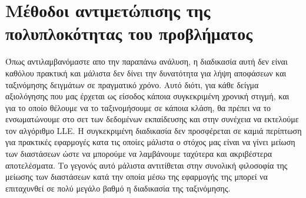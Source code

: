 \section{Μέθοδοι αντιμετώπισης της πολυπλοκότητας του προβλήματος}
\par
Όπως αντιλαμβανόμαστε απο την παραπάνω ανάλυση, η διαδικασία αυτή δεν είναι καθόλου πρακτική και μάλιστα δεν δίνει την δυνατότητα για λήψη αποφάσεων και ταξινόμησης δειγμάτων σε πραγματικό χρόνο. Αυτό διότι, για κάθε δείγμα αξιολόγησης που μας έρχεται ως είσοδος κάποια συγκεκριμένη χρονική στιγμή, και για το οποίο θέλουμε να το ταξινομήσουμε σε κάποια κλάση, θα πρέπει να το ενσωματώνουμε στο σετ των δεδομένων εκπαίδευσης και στην συνέχεια να εκτελούμε τον αλγόριθμο \textlatin{LLE}. Η συγκεκριμένη διαδικασία δεν προσφέρεται σε καμιά περίπτωση για πρακτικές εφαρμογές κατα τις οποίες μάλιστα ο στόχος μας είναι να γίνει μείωση των διαστάσεων ώστε να μπορούμε να λαμβάνουμε ταχύτερα και ακριβέστερα αποτελέσματα. Το γεγονός αυτό μάλιστα αντιτίθεται στην συνολική φιλοσοφία της μείωσης των διαστάσεων κατά την οποία μέσω της εφαρμογής της μπορεί να επιταχυνθεί σε πολύ μεγάλο βαθμό η διαδικασία της ταξινόμησης.

